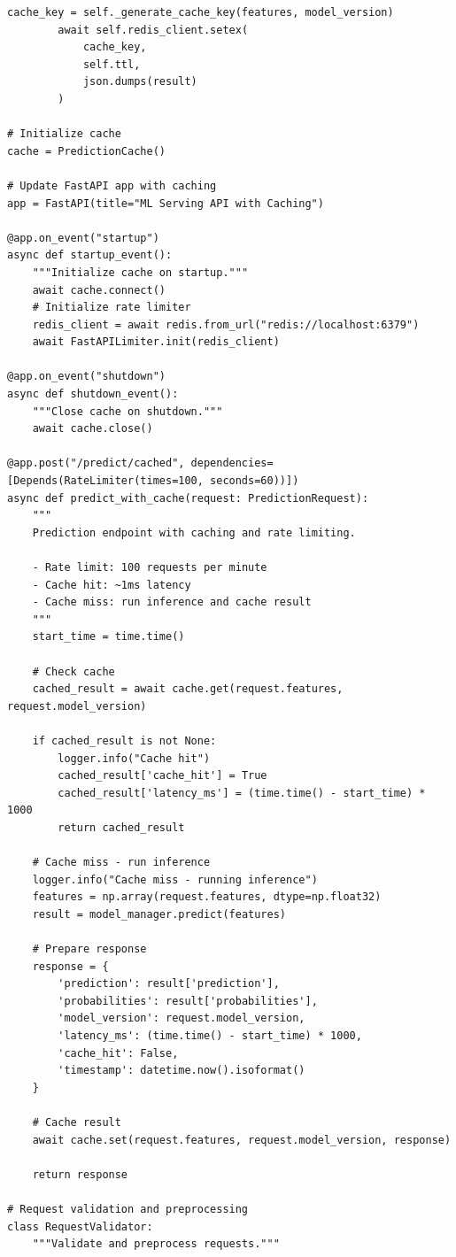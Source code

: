 \begin{lstlisting}[style=python, caption=Advanced serving features with caching and rate limiting]
        cache_key = self._generate_cache_key(features, model_version)
        await self.redis_client.setex(
            cache_key,
            self.ttl,
            json.dumps(result)
        )

# Initialize cache
cache = PredictionCache()

# Update FastAPI app with caching
app = FastAPI(title="ML Serving API with Caching")

@app.on_event("startup")
async def startup_event():
    """Initialize cache on startup."""
    await cache.connect()
    # Initialize rate limiter
    redis_client = await redis.from_url("redis://localhost:6379")
    await FastAPILimiter.init(redis_client)

@app.on_event("shutdown")
async def shutdown_event():
    """Close cache on shutdown."""
    await cache.close()

@app.post("/predict/cached", dependencies=[Depends(RateLimiter(times=100, seconds=60))])
async def predict_with_cache(request: PredictionRequest):
    """
    Prediction endpoint with caching and rate limiting.

    - Rate limit: 100 requests per minute
    - Cache hit: ~1ms latency
    - Cache miss: run inference and cache result
    """
    start_time = time.time()

    # Check cache
    cached_result = await cache.get(request.features, request.model_version)

    if cached_result is not None:
        logger.info("Cache hit")
        cached_result['cache_hit'] = True
        cached_result['latency_ms'] = (time.time() - start_time) * 1000
        return cached_result

    # Cache miss - run inference
    logger.info("Cache miss - running inference")
    features = np.array(request.features, dtype=np.float32)
    result = model_manager.predict(features)

    # Prepare response
    response = {
        'prediction': result['prediction'],
        'probabilities': result['probabilities'],
        'model_version': request.model_version,
        'latency_ms': (time.time() - start_time) * 1000,
        'cache_hit': False,
        'timestamp': datetime.now().isoformat()
    }

    # Cache result
    await cache.set(request.features, request.model_version, response)

    return response

# Request validation and preprocessing
class RequestValidator:
    """Validate and preprocess requests."""


\end{lstlisting}
